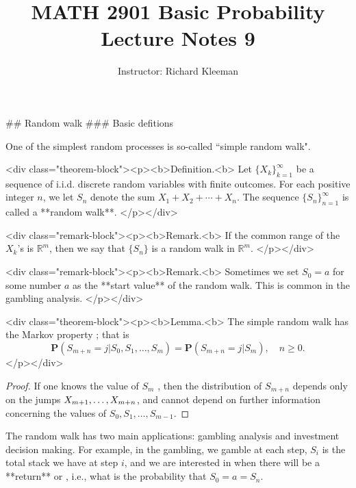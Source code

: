 


\title{MATH 2901 Basic Probability Lecture Notes 9}
\author{Instructor: Richard Kleeman}
\date{}
\maketitle


## Random walk
### Basic defitions

One of the simplest random processes is so-called ``simple 
random walk". 

<div class="theorem-block"><p><b>Definition.<b> 
Let $\{X_k\}_{k=1}^\infty$ be a sequence of i.i.d. discrete random variables with finite outcomes. For each positive integer $n$, we let $S_n$ denote the sum $X_1 +X_2 + \cdots + X_n$. The sequence $\{S_n\}_{n=1}^\infty$ is called a **random walk**.
</p></div>

<div class="remark-block"><p><b>Remark.<b> 
If the common range of the $X_k$’s is $\mathbb{R}^m$, then we say that $\{S_n\}$ is a random walk in $\mathbb{R}^m$.
</p></div>

<div class="remark-block"><p><b>Remark.<b> 
Sometimes we set $S_0 = a$ for some number $a$ as the **start value** of the random walk. This is common in the gambling analysis.
</p></div>

<div class="theorem-block"><p><b>Lemma.<b> 
The simple random walk has the Markov property ; that is
$$\begin{equation}
    \mathbf{P}\left(S_{m+n}=j | S_{0}, S_{1}, \ldots, S_{m}\right)=\mathbf{P}\left(S_{m+n}=j | S_{m}\right), \quad n \geq 0.
\end{equation}$$
</p></div>

\begin{proof}
If one knows the value of $S_m$ , then the distribution of $S_{m+n}$ depends only on the jumps $X_{m+ 1} ,\dots, \\ X_{m+n}$, and cannot depend on further information concerning the values of $S_0, S_1, \dots , S_{m-1}$.
\end{proof}

The random walk has two main applications: gambling analysis and investment decision making. For example, in the gambling, we gamble at each step, $S_i$ is the total stack we have at step $i$, and we are interested in when there will be a **return** or , i.e., what is the probability that $S_0 = a = S_n$.

